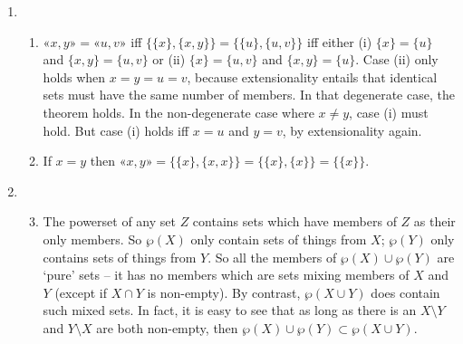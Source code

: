 {\begin{enumerate}
\begin{enumerate}
	\end{enumerate} \setcounter{enumi}{3}
	\item \begin{enumerate}
		\item $«x,y»= «u,v»$ iff $\{\{x\},\{x,y\}\} = \{\{u\},\{u,v\}\}$ iff either (i) $\{x\}=\{u\}$ and $\{x,y\}=\{u,v\}$ or (ii) $\{x\} = \{u,v\}$ and $\{x,y\} = \{u\}$. Case (ii) only holds when $x=y=u=v$, because extensionality entails that identical sets must have the same number of members. In that degenerate case, the theorem holds. In the non-degenerate case where $x≠y$, case (i) must hold. But case (i) holds iff $x=u$ and $y=v$, by extensionality again.
		\item If $x=y$ then $«x,y»=\{\{x\},\{x,x\}\}=\{\{x\},\{x\}\}=\{\{x\}\}$.
	\end{enumerate}
	\item  \begin{enumerate}\setcounter{enumii}{2}
		\item The powerset of any set $Z$ contains sets which have members of $Z$ as their only members. So $\wp(X)$ only contain sets of things from $X$; $\wp(Y)$ only contains sets of things from $Y$. So all the members of $\wp(X)\cup\wp(Y)$ are `pure' sets – it has no members which are sets mixing members of $X$ and $Y$ (except if $X \cap Y$ is non-empty). By contrast, $\wp(X\cup Y)$ does contain such mixed sets. In fact, it is easy to see that as long as there is an $X\setminus Y$ and $Y \setminus X$ are both non-empty, then $\wp(X) \cup \wp(Y) \subset \wp(X \cup Y)$. 


\end{enumerate}
\end{enumerate}}
